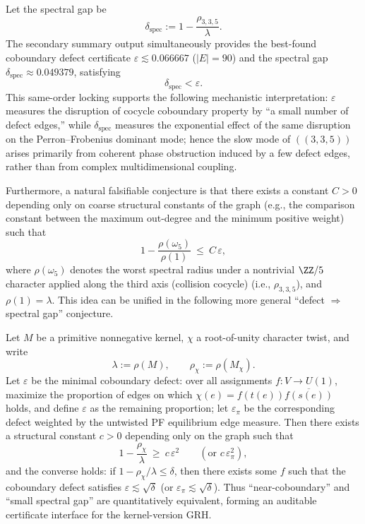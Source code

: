 \begin{remark}\label{rem:arity-335-eps-vs-gap}
Let the spectral gap be
$$
\delta_{\mathrm{spec}}:=1-\frac{\rho_{3,3,5}}{\lambda}.
$$
The secondary summary output simultaneously provides the best-found coboundary defect certificate \(\varepsilon\lesssim 0.066667\) (\(|E|=90\)) and the spectral gap
\(
\delta_{\mathrm{spec}}\approx 0.049379
\), satisfying
$$
\delta_{\mathrm{spec}}<\varepsilon.
$$
This same-order locking supports the following mechanistic interpretation: \(\varepsilon\) measures the disruption of cocycle coboundary property by ``a small number of defect edges,'' while \(\delta_{\mathrm{spec}}\) measures the exponential effect of the same disruption on the Perron--Frobenius dominant mode; hence the slow mode of \(((3,3,5))\) arises primarily from coherent phase obstruction induced by a few defect edges, rather than from complex multidimensional coupling.

Furthermore, a natural falsifiable conjecture is that there exists a constant \(C>0\) depending only on coarse structural constants of the graph (e.g., the comparison constant between the maximum out-degree and the minimum positive weight) such that
$$
1-\frac{\rho(\omega_5)}{\rho(1)}\ \le\ C\,\varepsilon,
$$
where \(\rho(\omega_5)\) denotes the worst spectral radius under a nontrivial \(\ZZ/5\) character applied along the third axis (collision cocycle) (i.e., \(\rho_{3,3,5}\)), and \(\rho(1)=\lambda\). This idea can be unified in the following more general ``defect $\Rightarrow$ spectral gap'' conjecture.
\end{remark}



\begin{conjecture}\label{conj:coboundary-defect-gap}
Let $M$ be a primitive nonnegative kernel, $\chi$ a root-of-unity character twist, and write
$$
\lambda:=\rho(M),\qquad \rho_\chi:=\rho(M_\chi).
$$
Let \(\varepsilon\) be the minimal coboundary defect: over all assignments \(f:V\to U(1)\), maximize the proportion of edges on which
\(
\chi(e)=f(t(e))\overline{f(s(e))}
\)
holds, and define \(\varepsilon\) as the remaining proportion; let \(\varepsilon_\pi\) be the corresponding defect weighted by the untwisted PF equilibrium edge measure. Then there exists a structural constant \(c>0\) depending only on the graph such that
$$
1-\frac{\rho_\chi}{\lambda}\ \ge\ c\,\varepsilon^2
\qquad(\text{or }c\,\varepsilon_\pi^2),
$$
and the converse holds: if \(1-\rho_\chi/\lambda\le \delta\), then there exists some \(f\) such that the coboundary defect satisfies \(\varepsilon\lesssim \sqrt{\delta}\) (or \(\varepsilon_\pi\lesssim \sqrt{\delta}\)). Thus ``near-coboundary'' and ``small spectral gap'' are quantitatively equivalent, forming an auditable certificate interface for the kernel-version GRH.
\end{conjecture}

